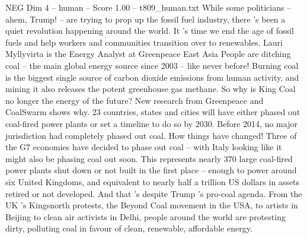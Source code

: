 \begin{textsample}{NEG Dim 4 – human – Score 1.00 – t809\_human.txt}  \label{ex:f4_neg_047}
While some politicians – ahem, Trump! – are trying to prop up the fossil fuel industry, there ’s been a quiet revolution happening around the world.
It ’s time we end the age of fossil fuels and help workers and communities transition over to renewables.
Lauri Myllyvirta is the Energy Analyst at Greenpeace East Asia People are ditching coal – the main global energy source since 2003 – like never before!
Burning coal is the biggest single source of carbon dioxide emissions from human activity, and mining it also releases the potent greenhouse gas methane.
So why is King Coal no longer the energy of the future?
New research from Greenpeace and CoalSwarm shows why. 23 countries, states and cities will have either phased out coal-fired power plants or set a timeline to do so by 2030.
Before 2014, no major jurisdiction had completely phased out coal.
How things have changed!
Three of the G7 economies have decided to phase out coal – with Italy looking like it might also be phasing coal out soon.
This represents nearly 370 large coal-fired power plants shut down or not built in the first place – enough to power around six United Kingdoms, and equivalent to nearly half a trillion US dollars in assets retired or not developed.
And that ’s despite Trump ’s pro-coal agenda.
From the UK ’s Kingsnorth protests, the Beyond Coal movement in the USA, to artists in Beijing to clean air activists in Delhi, people around the world are protesting dirty, polluting coal in favour of clean, renewable, affordable energy.

\end{textsample}
